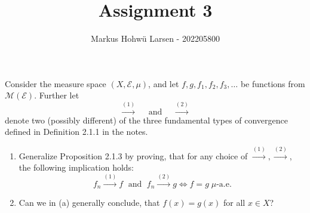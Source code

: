 \documentclass{Class}
\title{Assignment 3}
\author{Markus Hohwü Larsen - 202205800}
\begin{document}
Consider the measure space $(X,\mathcal{E}, \mu)$, and let $f,g,f_1,f_2,f_3,\ldots$ be functions from $\mathcal{M}(\mathcal{E})$. Further let
$$\stackrel{(1)}{\longrightarrow}\quad \text{ and }\quad \stackrel{(2)}{\longrightarrow}$$ 
denote two (possibly different) of the three fundamental types of convergence defined in Definition 2.1.1 in the notes.
\begin{enumerate}
    \item Generalize Proposition 2.1.3 by proving, that for any choice of $\stackrel{(1)}{\longrightarrow},\stackrel{(2)}{\longrightarrow}$, the following implication holds:
    \begin{equation}f_n\stackrel{(1)}{\longrightarrow}f\; \text{ and }\; f_n\stackrel{(2)}{\longrightarrow}g \Longleftrightarrow f=g \; \mu\text{-a.e.}\end{equation} 
    \item Can we in (a) generally conclude, that $f(x) = g(x)$ for all $x \in X$?
\end{enumerate}
\solution
\end{document}
